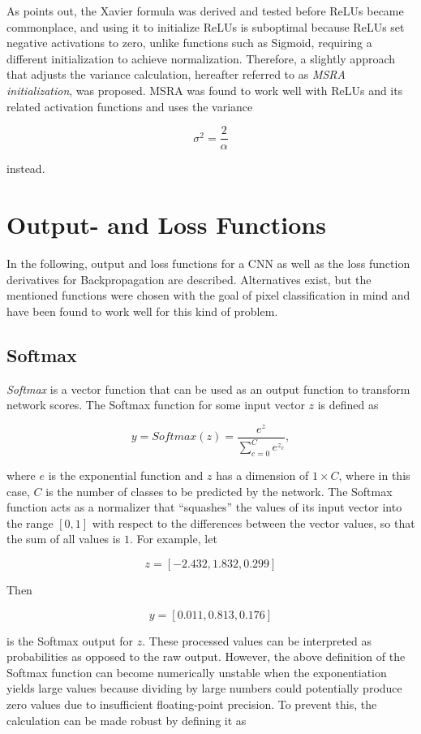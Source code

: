 \noindent As \cite{rectifiers} points out, the Xavier formula was derived and tested before ReLUs became commonplace, and using it to initialize ReLUs is suboptimal because ReLUs set negative activations to zero, unlike functions such as Sigmoid, requiring a different initialization to achieve normalization. Therefore, a slightly approach that adjusts the variance calculation, hereafter referred to as \textit{MSRA initialization}, was proposed. MSRA was found to work well with ReLUs and its related activation functions and uses the variance

\[ \sigma^2 = \frac{2}{\alpha} \]

\noindent instead.


	\section {Output- and Loss Functions}
In the following, output and loss functions for a CNN as well as the loss function derivatives for Backpropagation are described. Alternatives exist, but the mentioned functions were chosen with the goal of pixel classification in mind and have been found to work well for this kind of problem.


	\subsection{Softmax}
\label{subsec:softmax}

\textit{Softmax} is a vector function that can be used as an output function to transform network scores. The Softmax function for some input vector $z$ is defined as

\[y = Softmax(z) = \frac{e^{z}}{\sum_{c=0}^{C} e^{z_c}},\]

\noindent where $e$ is the exponential function and $z$ has a dimension of $1 \times C$, where in this case, $C$ is the number of classes to be predicted by the network. The Softmax function acts as a normalizer that ``squashes'' the values of its input vector into the range $[0, 1]$ with respect to the differences between the vector values, so that the sum of all values is $1$. For example, let 

\[ z = [-2.432, 1.832, 0.299] \]

\noindent Then 

\[ y = [0.011, 0.813, 0.176] \]

\noindent is the Softmax output for $z$. These processed values can be interpreted as probabilities as opposed to the raw output. However, the above definition of the Softmax function can become numerically unstable when the exponentiation yields large values because dividing by large numbers could potentially produce zero values due to insufficient floating-point precision. To prevent this, the calculation can be made robust by defining it as

